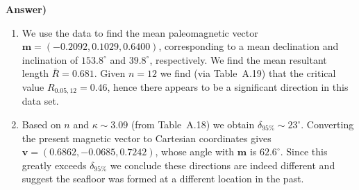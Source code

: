 \documentclass[10pt,letter]{report}
\renewcommand{\bf}{\textbf}
\begin{document}
	\bf{Answer)} \\
	\begin{enumerate}[label=\alph*)]
	\item We use the data to find the mean paleomagnetic vector
	$\mathbf{m} = (-0.2092, 0.1029, 0.6400)$, corresponding to a mean declination and inclination of $153.8^{\circ}$ and $39.8^{\circ}$,
	respectively.  We find the mean resultant length $\bar{R} = 0.681$.  Given $n = 12$ we find (via Table~A.19) that
	the critical value $R_{0.05,12} = 0.46$, hence there appears to be a significant direction in this data set.

	\item Based on $n$ and $\kappa \sim 3.09$ (from Table~A.18) we obtain $\delta_{95\%} \sim 23^{\circ}$.
	Converting the present magnetic vector to Cartesian coordinates gives $\mathbf{v} = (0.6862, -0.0685, 0.7242)$, whose
	angle with $\mathbf{m}$ is $62.6^{\circ}$. Since this greatly exceeds $\delta_{95\%}$ we conclude these directions are indeed
	different and suggest the seafloor was formed at a different location in the past.
	\end{enumerate}
\end{document}

